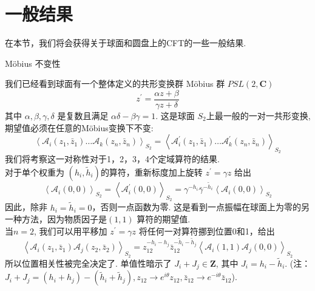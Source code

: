 \section{一般结果}%

在本节，我们将会获得关于球面和圆盘上的CFT的一些一般结果.\\

\centerline{\Large Möbius 不变性}
我们已经看到球面有一个整体定义的共形变换群 Möbius 群 $P S L(2, \mathbf{C})$
\begin{equation}
	z^{\prime}=\frac{\alpha z+\beta}{\gamma z+\delta}
\end{equation}
其中 $\alpha, \beta, \gamma, \delta$ 是复数且满足 $\alpha \delta-\beta \gamma=1$. 这是球面 $S_{2}$上最一般的一对一共形变换, 期望值必须在任意的Möbius变换下不变:
\begin{equation}
	\left\langle\mathscr{A}_{i}\left(z_{1}, \bar{z}_{1}\right) \ldots \mathscr{A}_{k}\left(z_{n}, \bar{z}_{n}\right)\right\rangle_{S_{2}}=\left\langle\mathscr{A}_{i}^{\prime}\left(z_{1}, \bar{z}_{1}\right) \ldots \mathscr{A}_{k}^{\prime}\left(z_{n}, \bar{z}_{n}\right)\right\rangle_{S_{2}}
\end{equation}
我们将考察这一对称性对于1，2，3，4个定域算符的结果.\\
对于单个权重为 $\left(h_{i}, \tilde{h}_{i}\right)$的算符，重新标度加上旋转 $z^{\prime}=\gamma z$ 给出
\begin{equation}
	\left\langle\mathscr{A}_{i}(0,0)\right\rangle_{S_{2}}=\left\langle\mathscr{A}_{i}^{\prime}(0,0)\right\rangle_{S_{2}}=\gamma^{-h_{i}} \bar{\gamma}^{-\tilde{h}_{i}}\left\langle\mathscr{A}_{i}(0,0)\right\rangle_{S_{2}}
\end{equation}
因此，除非 $h_{i}=\tilde{h}_{i}=0$，否则一点函数为零. 这是看到一点振幅在球面上为零的另一种方法，因为物质因子是$(1,1)$ 算符的期望值.\\
当$n=2$, 我们可以用平移加 $z^{\prime}=\gamma z$ 将任何一对算符挪到位置0和1，给出
\begin{equation}
	\left\langle\mathscr{A}_{i}\left(z_{1}, \bar{z}_{1}\right) \mathscr{A}_{j}\left(z_{2}, \bar{z}_{2}\right)\right\rangle_{S_{2}}=z_{12}^{-h_{i}-h_{j}} \bar{z}_{12}^{-\tilde{h}_{i}-\tilde{h}_{j}}\left\langle\mathscr{A}_{i}(1,1) \mathscr{A}_{j}(0,0)\right\rangle_{S_{2}}
\end{equation}
所以位置相关性被完全决定了. 单值性暗示了 $J_{i}+J_{j} \in \mathbf{Z}$, 其中 $J_{i}=h_{i}-\tilde{h}_{i} $.
(注：$J_{i}+J_{j}=\left(h_{i}+h_{j}\right)-\left(\tilde{h}_{i}+\tilde{h}_{j}\right), z_{12} \rightarrow e^{i \theta} z_{12},\bar{z}_{12}\rightarrow e^{-i \theta} \bar{z}_{12}$).
